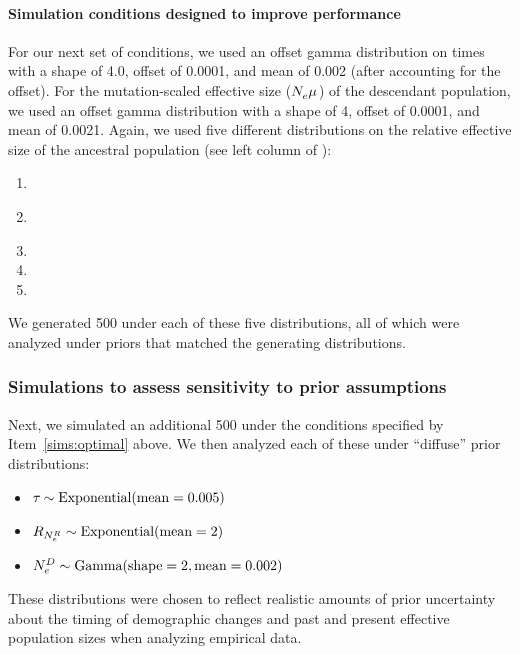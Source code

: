 \paragraph{Simulation conditions designed to improve performance}

For our next set of conditions, we used an offset gamma distribution on times
with a shape of 4.0, offset of 0.0001, and mean of 0.002 (after accounting for
the offset).
For the mutation-scaled effective size ($\epopsize\murate$) of the descendant
population, we used an offset gamma distribution with a shape of 4, offset of
0.0001, and mean of 0.0021.
Again, we used five different distributions on the relative effective size of
the ancestral population (see left column of
\figs
{}):
\begin{enumerate}[label=B.\arabic*]
    \item {} \label{sims:optimal}
    \item {} \label{sims:optimaltwofoldincrease}
    \item {}
    \item {}
    \item {}
\end{enumerate}
We generated 500 \datasets under each of these five distributions, all of which
were analyzed under priors that matched the generating distributions.

\subsubsection{Simulations to assess sensitivity to prior assumptions}

Next, we simulated an additional 500 \datasets under the conditions
specified by Item~\ref{sims:optimal} above.
We then analyzed each of these \datasets under ``diffuse'' prior
distributions:
\begin{itemize}
    \item $\etime \sim \dexponential{0.005}$
    \item $\rootrelativepopsize \sim \dexponential{2}$
    \item $\epopsize[\descendantpopindex{}] \sim \dgamma{2}{0.002}$
\end{itemize}
These distributions were chosen to reflect realistic amounts of prior
uncertainty about the timing of demographic changes and past and present
effective population sizes when analyzing empirical data.


